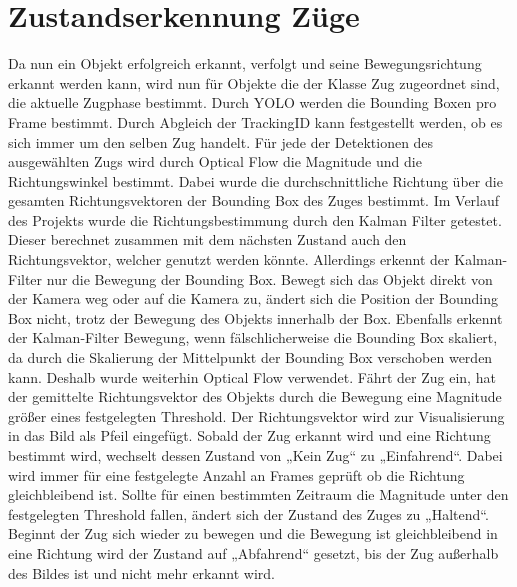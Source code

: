 \documentclass[conference]{IEEEtran}
\begin{document}
	\section{Zustandserkennung Züge}
	Da nun ein Objekt erfolgreich erkannt, verfolgt und seine Bewegungsrichtung erkannt werden kann, wird nun für Objekte die der Klasse Zug zugeordnet sind, die aktuelle Zugphase bestimmt.  
	Durch YOLO werden die Bounding Boxen pro Frame bestimmt. Durch Abgleich der TrackingID kann festgestellt werden, ob es sich immer um den selben Zug handelt. Für jede der Detektionen des ausgewählten Zugs wird durch Optical Flow die Magnitude und die Richtungswinkel bestimmt. Dabei wurde die durchschnittliche Richtung über die gesamten Richtungsvektoren der Bounding Box des Zuges bestimmt. Im Verlauf des Projekts wurde die Richtungsbestimmung durch den Kalman Filter getestet. Dieser berechnet zusammen mit dem nächsten Zustand auch den Richtungsvektor, welcher genutzt werden könnte. Allerdings erkennt der Kalman-Filter nur die Bewegung der Bounding Box. Bewegt sich das Objekt direkt von der Kamera weg oder auf die Kamera zu, ändert sich die Position der Bounding Box nicht, trotz der Bewegung des Objekts innerhalb der Box. Ebenfalls erkennt der Kalman-Filter Bewegung, wenn fälschlicherweise die Bounding Box skaliert, da durch die Skalierung der Mittelpunkt der Bounding Box verschoben werden kann. Deshalb wurde weiterhin Optical Flow verwendet. Fährt der Zug ein, hat der gemittelte Richtungsvektor des Objekts durch die Bewegung eine Magnitude größer eines festgelegten Threshold. Der Richtungsvektor wird zur Visualisierung in das Bild als Pfeil eingefügt. Sobald der Zug erkannt wird und eine Richtung bestimmt wird, wechselt dessen Zustand von „Kein Zug“ zu „Einfahrend“. Dabei wird immer für eine festgelegte Anzahl an Frames geprüft ob die Richtung gleichbleibend ist. Sollte für einen bestimmten Zeitraum die Magnitude unter den festgelegten Threshold fallen, ändert sich der Zustand des Zuges zu „Haltend“. Beginnt der Zug sich wieder zu bewegen und die Bewegung ist gleichbleibend in eine Richtung wird der Zustand auf „Abfahrend“ gesetzt, bis der Zug außerhalb des Bildes ist und nicht mehr erkannt wird.
	
\end{document}
